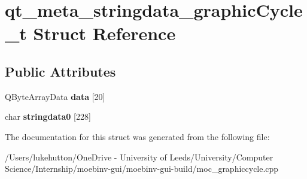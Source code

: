 \hypertarget{structqt__meta__stringdata__graphic_cycle__t}{}\section{qt\+\_\+meta\+\_\+stringdata\+\_\+graphic\+Cycle\+\_\+t Struct Reference}
\label{structqt__meta__stringdata__graphic_cycle__t}
\subsection*{Public Attributes}
\begin{DoxyCompactItemize}
\item 
\mbox{\label{structqt__meta__stringdata__graphic_cycle__t_a7d6ccfa54b966f7d6d259bdf378b3c62}} 
Q\+Byte\+Array\+Data {\bfseries data} \mbox{[}20\mbox{]}
\item 
\mbox{\label{structqt__meta__stringdata__graphic_cycle__t_a2d7f26c529a28c5e40d5a0d1522668b0}} 
char {\bfseries stringdata0} \mbox{[}228\mbox{]}
\end{DoxyCompactItemize}


The documentation for this struct was generated from the following file\+:\begin{DoxyCompactItemize}
\item 
/\+Users/lukehutton/\+One\+Drive -\/ University of Leeds/\+University/\+Computer Science/\+Internship/moebinv-\/gui/moebinv-\/gui-\/build/moc\+\_\+graphiccycle.\+cpp\end{DoxyCompactItemize}
